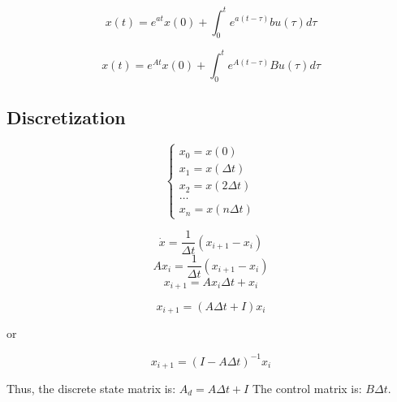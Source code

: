 \[x(t) = e^{at} x(0) + \int_{0}^{t} e^{a(t-\tau)} bu(\tau) d\tau\]

\begin{tcolorbox}[colback=white]
\[x(t) = e^{At} x(0) + \int_{0}^{t} e^{A(t-\tau)} Bu(\tau) d\tau\]
\end{tcolorbox}


\subsection{Discretization}

\[
\begin{cases}
    x_0 = x(0) \\
    x_1 = x(\Delta t) \\
    x_2 = x(2\Delta t) \\
    \dots \\
    x_n = x(n\Delta t)
\end{cases}
\]

\[\dot{x} = \frac{1}{\Delta t}(x_{i+1} - x_i)\]
\[Ax_i= \frac{1}{\Delta t}(x_{i+1} - x_i)\]
\[x_{i+1} = Ax_i \Delta t + x_i\]

\begin{tcolorbox}
\[x_{i+1} = (A\Delta t + I) x_i\]
\end{tcolorbox}

or

\begin{tcolorbox}
\[x_{i+1} = (I - A\Delta t)^{-1} x_i\]
\end{tcolorbox}

Thus, the discrete state matrix is: \(A_d = A\Delta t + I\)
The control matrix is: \(B\Delta t\).